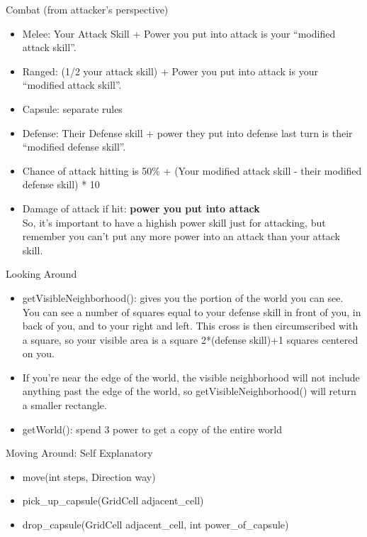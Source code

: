 \documentclass[aspectratio=169]{beamer}
\begin{document}
\begin{frame}{Combat (from attacker's perspective)}
  \begin{itemize}
  \item Melee: Your Attack Skill + Power you put into attack is your
    ``modified attack skill''.
  \item Ranged: (1/2 your attack skill) + Power you put into attack is
    your ``modified attack skill''.
  \item Capsule: separate rules
  \item Defense: Their Defense skill + power they put into defense
    last turn is their ``modified defense skill''.
  \item Chance of attack hitting is 50\% + (Your modified attack
    skill - their modified defense skill) * 10
  \item Damage of attack if hit: \textbf{power you put into attack}\\
    So, it's important to have a highish power skill just for
    attacking, but remember you can't put any more power into an
    attack than your attack skill.
  \end{itemize}
\end{frame}

\begin{frame}{Looking Around}
  \begin{itemize}
  \item getVisibleNeighborhood(): gives you the portion of the world
    you can see.  You can see a number of squares equal to your
    defense skill in front of you, in back of you, and to your right
    and left.  This cross is then circumscribed with a square, so
    your visible area is a square 2*(defense skill)+1 squares
    centered on you.
  \item If you're near the edge of the world, the visible
    neighborhood will not include anything past the edge of the
    world, so getVisibleNeighborhood() will return a smaller
    rectangle.
  \item getWorld(): spend 3 power to get a copy of the entire world
  \end{itemize}
\end{frame}

\begin{frame}{Moving Around: Self Explanatory}
  \begin{itemize}
  \item move(int steps, Direction way)
  \item pick\_up\_capsule(GridCell adjacent\_cell)
  \item drop\_capsule(GridCell adjacent\_cell, int power\_of\_capsule)
  \end{itemize}
\end{frame}
\end{document}
